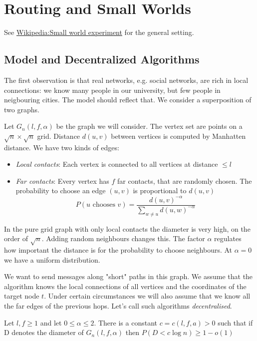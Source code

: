 \section{Routing and Small Worlds}

See \href{http://en.wikipedia.org/wiki/Small_world_experiment}{Wikipedia:Small world experiment} for the general setting.

\subsection{Model and Decentralized Algorithms}

The first observation is that real networks, e.g. social networks, are rich in local connections: we know many people in our university, but few people in neigbouring cities. The model should reflect that. We consider a superposition of two graphs.

Let $G_n(l,f,\alpha)$ be the graph we will consider. The vertex set are points on a $\sqrt{n}\times \sqrt{n}$ grid. Distance $d(u,v)$ between vertices is computed by Manhatten distance. We have two kinds of edges:

\begin{itemize}
\item \emph{Local contacts}: Each vertex is connected to all vertices at distance $\leq l$
\item \emph{Far contacts}: Every vertex has $f$ far contacts, that are randomly chosen. The probability to choose an edge $(u,v)$ is proportional to $d(u,v)$
\[P(\text{$u$ chooses $v$}) = \frac{d(u,v)^{-\alpha}}{\sum_{w\neq u} d(u,w)^{-\alpha}}\]
\end{itemize}

In the pure grid graph with only local contacts the diameter is very high, on the order of $\sqrt n$. Adding random neighbours changes this. The factor $\alpha$ regulates how important the distance is for the probability to choose neighbours. At $\alpha=0$ we have a uniform distribution.

We want to send messages along "short" paths in this graph. We assume that the algorithm knows the local connections of all vertices and the coordinates of the target node $t$. Under certain circumstances we will also assume that we know all the far edges of the previous hops. Let's call such algorithms \emph{decentralised}.

\begin{thm}\label{thm:small_world_graphs} Let $l,f\geq 1$ and let $0\leq \alpha \leq 2$. There is a constant $c=c(l,f,a) > 0$ such that if D denotes the diameter of $G_n(l,f,\alpha)$ then $P(D<c\log n) \geq 1-o(1)$
\end{thm}

